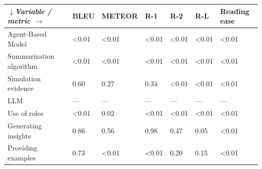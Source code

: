 \begin{tabular}{|l|l|l|l|l|l|l|}
\hline
\textit{$\downarrow$Variable / metric $\rightarrow$} & BLEU & METEOR & R-1 & R-2 & R-L & Reading ease \\
 \hline
 Agent-Based Model & \textless{}0.01 & \textless{}0.01 & \textless{}0.01 & \textless{}0.01 & \textless{}0.01 & \textless{}0.01 \\
 \hline
 Summarization algorithm & \textless{}0.01 & \textless{}0.01 & \textless{}0.01 & \textless{}0.01 & \textless{}0.01 & \textless{}0.01 \\
 \hline
 Simulation evidence & 0.60 & 0.27 & 0.34 & \textless{}0.01 & \textless{}0.01 & \textless{}0.01 \\
 \hline
 LLM & — & — & — & — & — & — \\
 \hline
 Use of roles & \textless{}0.01 & 0.02 & \textless{}0.01 & \textless{}0.01 & \textless{}0.01 & \textless{}0.01 \\
 \hline
 Generating insights & 0.86 & 0.56 & 0.98 & 0.47 & 0.05 & \textless{}0.01 \\
 \hline
 Providing examples & 0.73 & \textless{}0.01 & \textless{}0.01 & 0.20 & 0.15 & \textless{}0.01 \\
\hline
\end{tabular}
